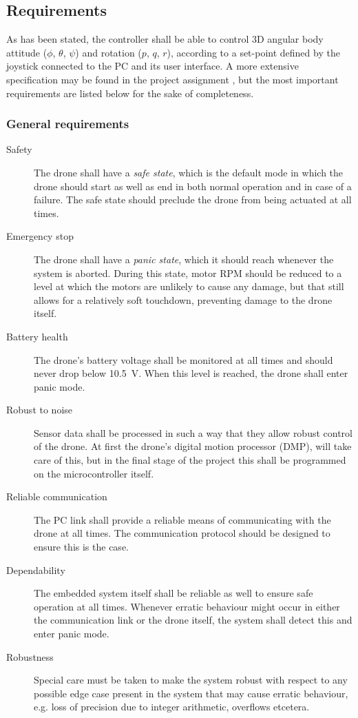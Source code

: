 \documentclass[final]{article}
\begin{document}
\subsection{Requirements}
\label{sec:requirements}
As has been stated, the controller shall be able to control 3D angular body attitude ($\phi$, $\theta$, $\psi$) and rotation ($p$, $q$, $r$), according to a set-point defined by the joystick connected to the PC and its user interface.
A more extensive specification may be found in the project assignment \cite[3-6]{langendoen2017in4073}, but the most important requirements are listed below for the sake of completeness.

\subsubsection{General requirements}

\begin{description}
	\item[Safety] The drone shall have a \emph{safe state}, which is the default mode in which the drone should start as well as end in both normal operation and in case of a failure. The safe state should preclude the drone from being actuated at all times.
	\item[Emergency stop] The drone shall have a \emph{panic state}, which it should reach whenever the system is aborted. During this state, motor RPM should be reduced to a level at which the motors are unlikely to cause any damage, but that still allows for a relatively soft touchdown, preventing damage to the drone itself.
	\item[Battery health] The drone's battery voltage shall be monitored at all times and should never drop below \SI{10.5}{\volt}. When this level is reached, the drone shall enter panic mode.
	\item[Robust to noise] Sensor data shall be processed in such a way that they allow robust control of the drone. At first the drone's digital motion processor (DMP), will take care of this, but in the final stage of the project this shall be programmed on the microcontroller itself.
	\item[Reliable communication] The PC link shall provide a reliable means of communicating with the drone at all times. The communication protocol should be designed to ensure this is the case.
	\item[Dependability] The embedded system itself shall be reliable as well to ensure safe operation at all times. Whenever erratic behaviour might occur in either the communication link or the drone itself, the system shall detect this and enter panic mode.
	\item[Robustness] Special care must be taken to make the system robust with respect to any possible edge case present in the system that may cause erratic behaviour, e.g. loss of precision due to integer arithmetic, overflows etcetera.
\end{description}
\end{document}
